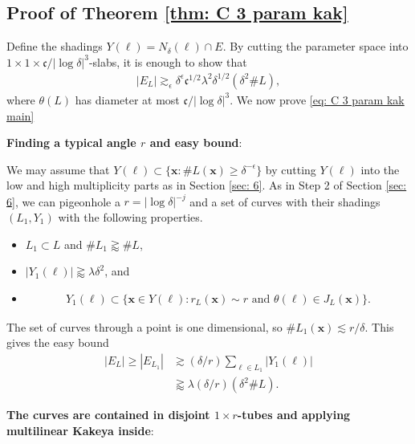 \documentclass[12pt]{amsart}
\newcommand{\x}{{\bf{x}}}
\numberwithin{equation}{section}
\newcommand{\1}{\mathbbm{1}}
\renewcommand{\x}{\mathbf x}
\begin{document}
\subsection{Proof of Theorem \ref{thm: C 3 param kak}}

Define the shadings $Y(\ell) = N_\delta(\ell) \cap E$. 
By cutting the parameter space into $1 \times 1 \times \mathfrak c / |\log \delta|^3$-slabs, it is enough to show that 
\begin{align}\label{eq: C 3 param kak main}
    |E_L| \gtrsim_\epsilon  \delta^\epsilon \mathfrak c^{1/2} \lambda^2 \delta^{1/2} (\delta^2 \# L), 
\end{align}
where $\theta(L)$ has diameter at most $\mathfrak c / |\log \delta|^3$. We now prove \eqref{eq: C 3 param kak main}

\noindent \textbf{Finding a typical angle $r$ and easy bound}:

We may assume that $Y(\ell) \subset \{\x : \# L(\x) \geq \delta^{-\epsilon}\}$ by cutting $Y(\ell)$ into the low and high multiplicity parts as in Section \ref{sec: 6}. As in Step 2 of Section \ref{sec: 6}, we can pigeonhole a $r = |\log \delta|^{-j}$ and a set of curves with their shadings $(L_1, Y_1)$ with the following properties.
\begin{itemize}
    \item $L_1 \subset L$ and $\#L_1 \gtrapprox \# L$, 
    \item $|Y_1(\ell)| \gtrapprox \lambda \delta^2$, and 
    \item 
    \begin{align}
        Y_1(\ell) \subset \{\x \in Y(\ell) : r_{L}(\x) \sim r \text{ and } \theta(\ell) \in J_{L}(\x)\}. \label{eq: C kak shading cond}
    \end{align}
\end{itemize}
The set of curves through a point is one dimensional, so $\# L_1(\x) \lesssim r/\delta$. This gives the easy bound
\begin{align}\label{eq: C kak easy bd}
    |E_L| \geq
    |E_{L_1}| &\gtrsim (\delta / r) \sum_{\ell \in L_1} |Y_1(\ell)| \\
    &\gtrapprox \lambda (\delta / r) (\delta^2 \# L). 
\end{align}

\noindent \textbf{The curves are contained in disjoint $1 \times r$-tubes and applying multilinear Kakeya inside}:
\end{document}
